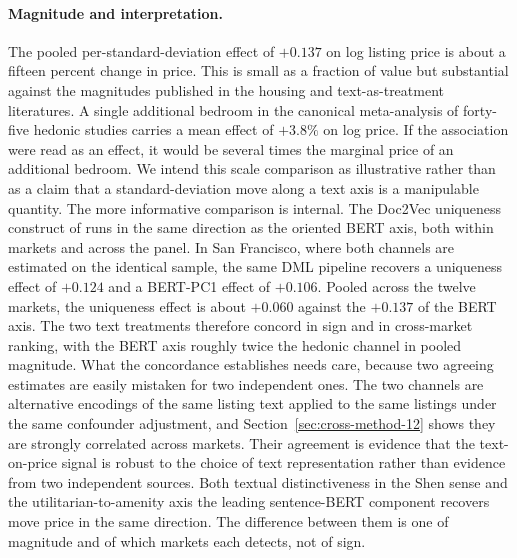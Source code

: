\paragraph{Magnitude and interpretation.} The pooled per-standard-deviation
effect of $+0.137$ on log listing price is about a fifteen percent change in price.
This is small as a fraction of value but substantial against the magnitudes
published in the housing and text-as-treatment literatures. A single additional
bedroom in the canonical \citet{sirmans2005composition} meta-analysis of
forty-five hedonic studies carries a mean effect of $+3.8\%$ on log price. If
the association were read as an effect, it would be several times the marginal
price of an additional bedroom. We intend this scale comparison as illustrative
rather than as a claim that a standard-deviation move along a text axis is a
manipulable quantity.
The more informative comparison is internal. The Doc2Vec uniqueness construct of
\citet{shen2021information} runs in the same direction as the oriented BERT axis,
both within markets and across the panel. In San Francisco, where both channels
are estimated on the identical sample, the same DML pipeline recovers a
uniqueness effect of $+0.124$ and a BERT-PC1 effect of $+0.106$. Pooled across
the twelve markets, the uniqueness effect is about $+0.060$ against the $+0.137$ of
the BERT axis. The two text treatments therefore concord in sign and in
cross-market ranking, with the BERT axis roughly twice the hedonic channel in
pooled magnitude. What the concordance establishes needs care, because two agreeing
estimates are easily mistaken for two independent ones. The two channels are
alternative encodings of the same listing text applied to the same listings under the
same confounder adjustment, and Section~\ref{sec:cross-method-12} shows they are
strongly correlated across markets. Their agreement is evidence that the
text-on-price signal is robust to the choice of text representation rather than
evidence from two independent sources. Both textual distinctiveness in the Shen sense
and the utilitarian-to-amenity axis the leading sentence-BERT component recovers move
price in the same direction. The difference between them is one of magnitude and
of which markets each detects, not of sign.

